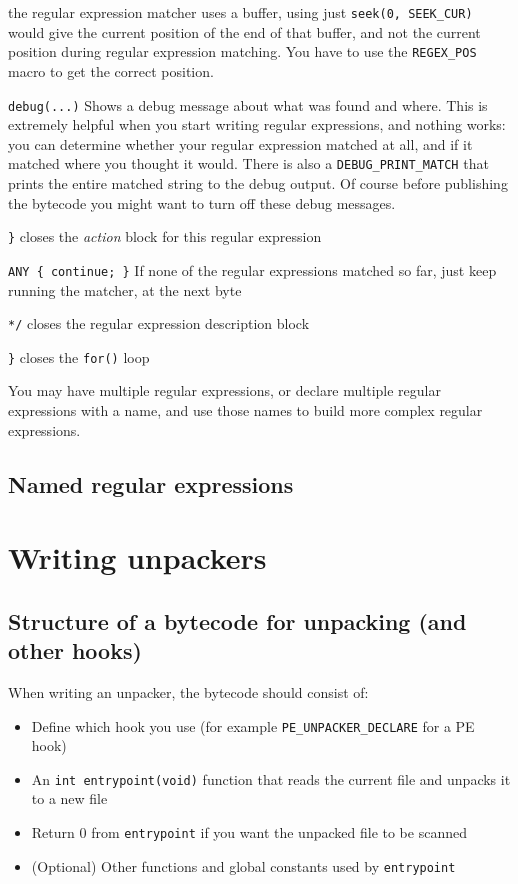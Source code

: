 \begin{description}
the regular expression matcher uses a buffer, using just \verb+seek(0, SEEK_CUR)+ would give the current position of the end of that buffer, and
not the current position during regular expression matching. You have to use the \verb+REGEX_POS+ macro to get the correct position.
 \item \verb+debug(...)+ Shows a debug message about what was found and where. This is extremely helpful when you start writing regular expressions, and
nothing works: you can determine whether your regular expression matched at all, and if it matched where you thought it would.
There is also a \verb+DEBUG_PRINT_MATCH+ that prints the entire matched string to the debug output. 
Of course before publishing the bytecode you might want to turn off these debug messages.
 \item \verb+}+ closes the \emph{action} block for this regular expression
 \item \verb+ANY { continue; }+ If none of the regular expressions matched so far, just keep running the matcher, at the next byte
 \item \verb+*/+ closes the regular expression description block
 \item \verb+}+ closes the \verb+for()+ loop
\end{description}

You may have multiple regular expressions, or declare multiple regular expressions with a name, and use those
names to build more complex regular expressions.

\subsection{Named regular expressions}


\section{Writing unpackers}
\label{sec:unpacker}
\subsection{Structure of a bytecode for unpacking (and other hooks)}
When writing an unpacker, the bytecode should consist of:
\begin{itemize}
 \item Define which hook you use (for example \verb+PE_UNPACKER_DECLARE+ for a PE hook)
 \item An \verb+int entrypoint(void)+ function that reads the current file and unpacks it to a new file
 \item Return 0 from \verb+entrypoint+ if you want the unpacked file to be scanned %
 \item (Optional) Other functions and global constants used by \verb+entrypoint+
\end{itemize}

